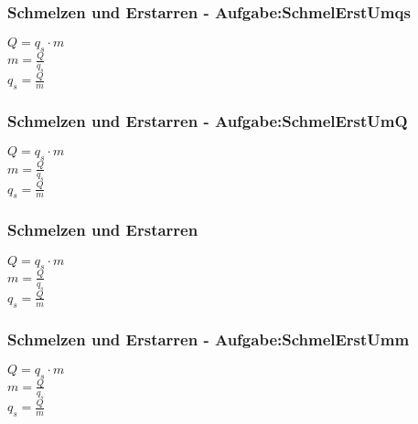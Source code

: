 \subsubsection{Schmelzen und Erstarren - Aufgabe:SchmelErstUmqs} 
\begin{minipage}{0.45\textwidth} 
$ Q = q_{s} \cdot m $\\ 
$ m = \frac{Q}{q_{s} } $\\ 
$ q_{s}  = \frac{Q}{m} $\\ 
\end{minipage} 
\begin{minipage}{0.45\textwidth} 
 
\end{minipage} 
\subsubsection{Schmelzen und Erstarren - Aufgabe:SchmelErstUmQ} 
\begin{minipage}{0.45\textwidth} 
$ Q = q_{s} \cdot m $\\ 
$ m = \frac{Q}{q_{s} } $\\ 
$ q_{s}  = \frac{Q}{m} $\\ 
\end{minipage} 
\begin{minipage}{0.45\textwidth} 
 
\end{minipage} 
\subsubsection{Schmelzen und Erstarren} 
\begin{minipage}{0.45\textwidth} 
$ Q = q_{s} \cdot m $\\ 
$ m = \frac{Q}{q_{s} } $\\ 
$ q_{s}  = \frac{Q}{m} $\\ 
\end{minipage} 
\begin{minipage}{0.45\textwidth} 
 
\end{minipage} 
\subsubsection{Schmelzen und Erstarren - Aufgabe:SchmelErstUmm} 
\begin{minipage}{0.45\textwidth} 
$ Q = q_{s} \cdot m $\\ 
$ m = \frac{Q}{q_{s} } $\\ 
$ q_{s}  = \frac{Q}{m} $\\ 
\end{minipage} 
\begin{minipage}{0.45\textwidth} 
 
\end{minipage} 
